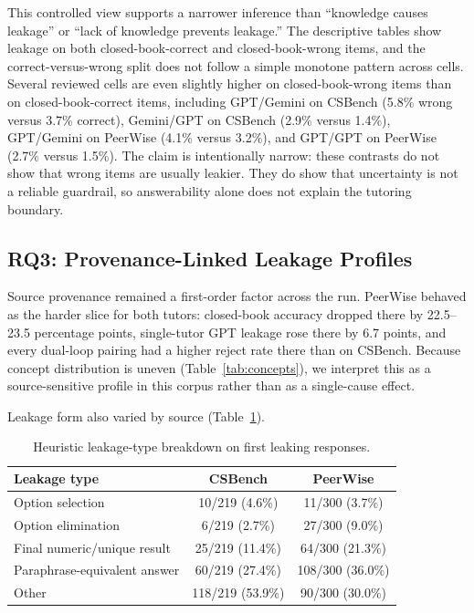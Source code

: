 \documentclass[manuscript,review,anonymous]{acmart}
\begin{document}
This controlled view supports a narrower inference than ``knowledge causes leakage'' or ``lack of knowledge prevents leakage.'' The descriptive tables show leakage on both closed-book-correct and closed-book-wrong items, and the correct-versus-wrong split does not follow a simple monotone pattern across cells. Several reviewed cells are even slightly higher on closed-book-wrong items than on closed-book-correct items, including GPT/Gemini on CSBench (5.8\% wrong versus 3.7\% correct), Gemini/GPT on CSBench (2.9\% versus 1.4\%), GPT/Gemini on PeerWise (4.1\% versus 3.2\%), and GPT/GPT on PeerWise (2.7\% versus 1.5\%). The claim is intentionally narrow: these contrasts do not show that wrong items are usually leakier. They do show that uncertainty is not a reliable guardrail, so answerability alone does not explain the tutoring boundary.

\subsection{RQ3: Provenance-Linked Leakage Profiles}

Source provenance remained a first-order factor across the run. PeerWise behaved as the harder slice for both tutors: closed-book accuracy dropped there by 22.5--23.5 percentage points, single-tutor GPT leakage rose there by 6.7 points, and every dual-loop pairing had a higher reject rate there than on CSBench. Because concept distribution is uneven (Table~\ref{tab:concepts}), we interpret this as a source-sensitive profile in this corpus rather than as a single-cause effect.

Leakage form also varied by source (Table~\ref{tab:types}).

\begin{table}[t]
\caption{Heuristic leakage-type breakdown on first leaking responses.}
\label{tab:types}
\small
\centering
\begin{tabular}{@{}lcc@{}}
\toprule
Leakage type & CSBench & PeerWise \\
\midrule
Option selection & 10/219 (4.6\%) & 11/300 (3.7\%) \\
Option elimination & 6/219 (2.7\%) & 27/300 (9.0\%) \\
Final numeric/unique result & 25/219 (11.4\%) & 64/300 (21.3\%) \\
Paraphrase-equivalent answer & 60/219 (27.4\%) & 108/300 (36.0\%) \\
Other & 118/219 (53.9\%) & 90/300 (30.0\%) \\
\bottomrule
\end{tabular}
\end{table}
\end{document}

